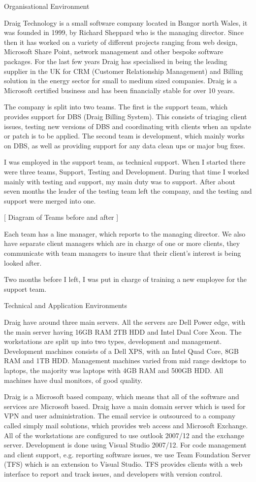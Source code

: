 Organisational Environment

Draig Technology is a small software company located in Bangor north Wales, it was founded in 1999, by Richard Sheppard who is the managing director.  Since then it has worked on a variety of different projects ranging from web design, Microsoft Share Point, network management and other bespoke software packages.   For the last few years Draig has specialised in being the leading supplier in the UK for CRM (Customer Relationship Management) and Billing solution in the energy sector for small to medium sized companies. Draig is a Microsoft certified business and has been financially stable for over 10 years. 

The company is split into two teams. The first is the support team, which provides support for DBS (Draig Billing System).  This consists of triaging client issues, testing new versions of DBS and coordinating with clients when an update or patch is to be applied. The second team is development, which mainly works on DBS, as well as providing support for any data clean ups or major bug fixes.

I was employed in the support team, as technical support. When I started there were three teams, Support, Testing and Development. During that time I worked mainly with testing and support, my main duty was to support. After about seven months the leader of the testing team left the company, and the testing and support were merged into one.  

[ Diagram of Teams before and after ]

Each team has a line manager, which reports to the managing director. We also have separate client managers which are in charge of one or more clients, they communicate with team managers to insure that their client's interest is being looked after.

Two months before I left, I was put in charge of training a new employee for the support team.


Technical and Application Environments

Draig have around three main servers. All the servers are Dell Power edge, with the main server having 16GB RAM 2TB HDD and Intel Dual Core Xeon. The workstations are split up into two types, development and management. Development machines consists of a Dell XPS, with an Intel Quad Core, 8GB RAM and 1TB HDD. Management machines varied from mid range desktops to laptops, the majority was laptops with 4GB RAM and 500GB HDD. All machines have dual monitors, of good quality.

Draig is a Microsoft based company, which means that all of the software and services are Microsoft based. Draig have a main domain server which is used for VPN and user administration. The email service is outsourced to a company called simply mail solutions, which provides web access and Microsoft Exchange. All of the workstations are configured to use outlook 2007/12 and the exchange server. Development is done using Visual Studio 2007/12. For code management and client support, e.g. reporting software issues, we use Team Foundation Server (TFS) which is an extension  to Visual Studio. TFS provides clients with a web interface to report and track issues, and developers with version control.

